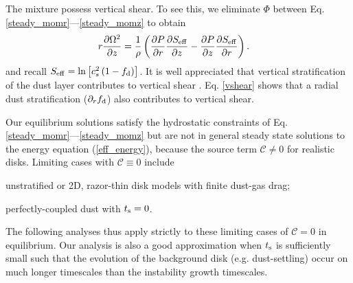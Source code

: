 The mixture possess vertical shear. To see this, we eliminate $\Phi$
between Eq. \ref{steady_momr}---\ref{steady_momz} to 
obtain 
\begin{align}\label{vshear}
  r\frac{\p \Omega^2}{\p z} 
   &= \frac{1}{\rho}\left(\frac{\p P}{\p r}\frac{\p \seff}{\p z} -\frac{\p
    P}{\p z}\frac{\p \seff}{\p r} \right).%
\end{align}
and recall $S_\mathrm{eff} = \ln{\left[c_s^2\left(1-f_\mathrm{d}\right)\right]}$. It is well appreciated that 
vertical stratification of the dust layer contributes to vertical shear
\citep{chiang08}. Eq. \ref{vshear} shows that a radial dust
stratification ($\partial_rf_\mathrm{d}$) also contributes to vertical shear.  



Our equilibrium solutions satisfy the hydrostatic constraints of
Eq. \ref{steady_momr}---\ref{steady_momz} but are not in general
steady state solutions to the energy 
equation (\ref{eff_energy}), because the source term $\mathcal{C} \ne0$ for realistic disks.  
Limiting cases with $\mathcal{C} \equiv 0$ include \begin{inparaenum}[1)] 
\item 
  unstratified or 2D, razor-thin disk models with finite dust-gas drag; %
\item 
  perfectly-coupled dust with $t_\mathrm{s}=0$. %
\end{inparaenum} 
The following analyses thus apply strictly to these limiting cases of
$\mathcal{C} = 0$ in equilibrium.  Our analysis is also a good approximation when 
$t_\mathrm{s}$ is sufficiently small such that the evolution of the background disk (e.g. dust-settling) 
occur on much longer timescales than the instability growth timescales. 








